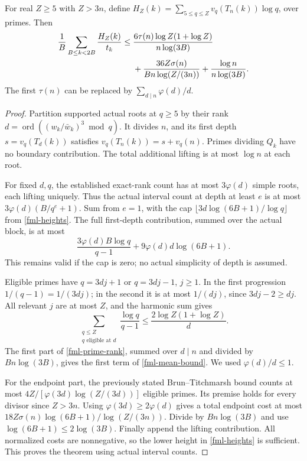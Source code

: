 \begin{theorem}\label{fml-mean}
For real $Z\ge5$ with $Z>3n$, define
$H_Z(k)=\sum_{5\le q\le Z}v_q(T_n(k))\log q$, over primes.
Then
\begin{align}
 \frac1B\sum_{B\le k<2B}\frac{H_Z(k)}{t_k}
 \le{}&\frac{6\tau(n)\log Z(1+\log Z)}{n\log(3B)}\notag\\
      &+\frac{36Z\sigma(n)}{Bn\log(Z/(3n))}
          +\frac{\log n}{n\log(3B)}.
          \label{fml-mean-bound}
\end{align}
The first $\tau(n)$ can be replaced by $\sum_{d\mid n}\varphi(d)/d$.
\end{theorem}
\begin{proof}
Partition supported actual roots at $q\ge5$ by their rank
$d=\operatorname{ord}((w_k/\bar w_k)^3\bmod q)$. It divides $n$,
and its first depth $s=v_q(T_d(k))$ satisfies
$v_q(T_n(k))=s+v_q(n)$. Primes dividing $Q_k$ have no boundary
contribution. The total additional lifting is at most $\log n$
at each root.

For fixed $d,q$, the established exact-rank count has at most
$3\varphi(d)$ simple roots, each lifting uniquely. Thus the actual
interval count at depth at least $e$ is at most
$3\varphi(d)(B/q^e+1)$. Sum from $e=1$, with the cap
$\lfloor3d\log(6B+1)/\log q\rfloor$ from \eqref{fml-heights}.
The full first-depth contribution, summed over the actual block, is
at most
\begin{equation}\label{fml-prime-rank}
 \frac{3\varphi(d)B\log q}{q-1}
                      +9\varphi(d)d\log(6B+1).
\end{equation}
This remains valid if the cap is zero; no actual simplicity of depth
is assumed.

Eligible primes have $q=3dj+1$ or $q=3dj-1$, $j\ge1$.
In the first progression $1/(q-1)=1/(3dj)$; in the second it is
at most $1/(dj)$, since $3dj-2\ge dj$. All relevant $j$ are at
most $Z$, and the harmonic sum gives
\[
 \sum_{\substack{q\le Z\\q\text{ eligible at }d}}
        \frac{\log q}{q-1}
 \le\frac{2\log Z(1+\log Z)}d.
\]
The first part of \eqref{fml-prime-rank}, summed over $d\mid n$
and divided by $Bn\log(3B)$, gives the first term of
\eqref{fml-mean-bound}. We used $\varphi(d)/d\le1$.

For the endpoint part, the previously stated Brun--Titchmarsh bound
counts at most $4Z/[\varphi(3d)\log(Z/(3d))]$ eligible primes.
Its premise holds for every divisor since $Z>3n$.
Using $\varphi(3d)\ge2\varphi(d)$ gives a total endpoint cost at
most $18Z\sigma(n)\log(6B+1)/\log(Z/(3n))$.
Divide by $Bn\log(3B)$ and use $\log(6B+1)\le2\log(3B)$.
Finally append the lifting contribution. All normalized costs are
nonnegative, so the lower height in \eqref{fml-heights} is sufficient.
This proves the theorem using actual interval counts.
\end{proof}

